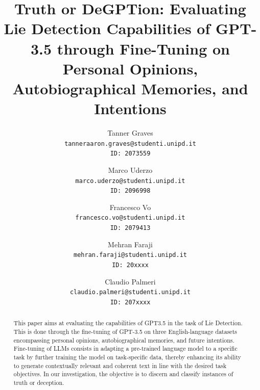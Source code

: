 \documentclass[10pt,twocolumn,letterpaper]{article}
\begin{document}
\title{Truth or DeGPTion: Evaluating Lie Detection Capabilities of GPT-3.5 through Fine-Tuning on Personal Opinions, Autobiographical Memories, and Intentions}


\author{
Tanner Graves\\
{\tt\small tanneraaron.graves@studenti.unipd.it} \\
{\tt\small ID: 2073559} \\
\and
Marco Uderzo\\
{\tt\small marco.uderzo@studenti.unipd.it} \\
{\tt\small ID: 2096998} \\
\and
Francesco Vo \\
{\tt\small francesco.vo@studenti.unipd.it} \\
{\tt\small ID: 2079413} \\
\and
Mehran Faraji\\
{\tt\small mehran.faraji@studenti.unipd.it} \\
{\tt\small ID: 20xxxx} \\
\and
Claudio Palmeri \\
{\tt\small claudio.palmeri@studenti.unipd.it} \\
{\tt\small ID: 207xxxx} \\
}

\maketitle


\begin{abstract}
This paper aims at evaluating the capabilities of GPT3.5 in the task of Lie Detection.
This is done through the fine-tuning of GPT-3.5 on three English-language datasets encompassing 
personal opinions, autobiographical memories, and future intentions. 
Fine-tuning of LLMs consists in adapting a pre-trained language model to a specific 
task by further training the model on task-specific data, thereby 
enhancing its ability to generate contextually relevant and coherent text in 
line with the desired task objectives. In our investigation, the objective is to 
discern and classify instances of truth or deception.

\end{abstract}

\end{document}

